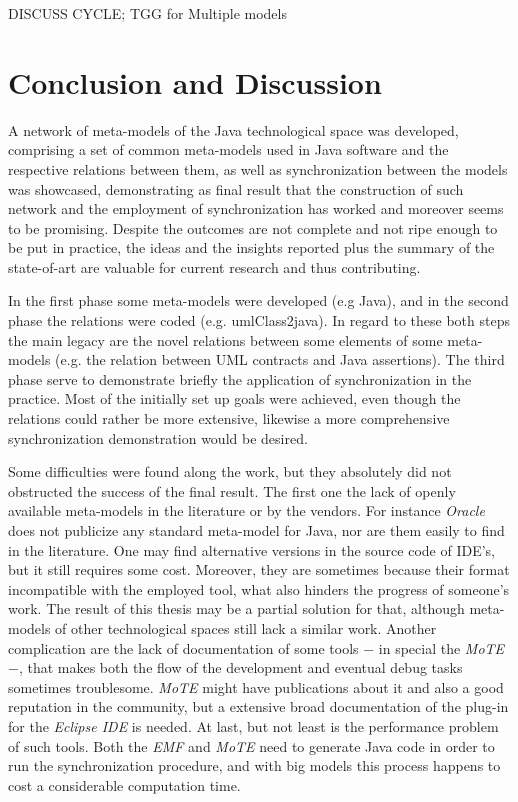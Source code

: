 \documentclass[tuberlin,cic,tc,english,noabntcite]{iiufrgs}
\begin{document}
DISCUSS CYCLE; TGG for Multiple models

\chapter{Conclusion and Discussion}
A network of meta-models of the Java technological space was developed, comprising a set of common meta-models used in Java software and the respective relations between them, as well as synchronization between the models was showcased, demonstrating as final result that the construction of such network and the employment of synchronization has worked and moreover seems to be promising. Despite the outcomes are not complete and not ripe enough to be put in practice, the ideas and the insights reported plus the summary of the state-of-art are valuable for current research and thus contributing.

In the first phase some meta-models were developed (e.g Java), and in the second phase the relations were coded (e.g. umlClass2java). In regard to these both steps the main legacy are the novel relations between some elements of some meta-models (e.g. the relation between UML contracts and Java assertions). The third phase serve to demonstrate briefly the application of synchronization in the practice. Most of the initially set up goals were achieved, even though the relations could rather be more extensive, likewise a more comprehensive synchronization demonstration would be desired.


Some difficulties were found along the work, but they absolutely did not obstructed the success of the final result. The first one the lack of openly available meta-models in the literature or by the vendors. For instance \emph{Oracle} does not publicize any standard meta-model for Java, nor are them easily to find in the literature. One may find alternative versions in the source code of IDE's, but it still requires some cost. Moreover, they are sometimes because their format incompatible with the employed tool, what also hinders the progress of someone's work. The result of this thesis may be a partial solution for that, although meta-models of other technological spaces still lack a similar work. Another complication are the lack of documentation of some tools $-$ in special the \emph{MoTE} $-$, that makes both the flow of the development and eventual debug tasks sometimes troublesome. \emph{MoTE} might have publications about it and also a good reputation in the community, but a extensive broad documentation of the plug-in for the \emph{Eclipse IDE} is needed. At last, but not least is the performance problem of such tools. Both the \emph{EMF} and \emph{MoTE} need to generate Java code in order to run the synchronization procedure, and with big models this process happens to cost a considerable computation time.
\end{document}
